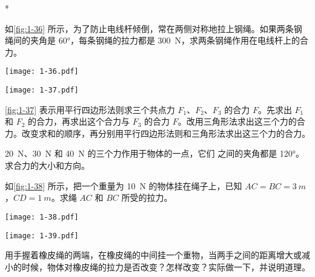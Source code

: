 \begin{Exercise}*
\begin{question}
\item 如\cref{fig:1-36} 所示，为了防止电线杆倾倒，常在两侧对称地拉上钢绳。如果两条钢绳间的夹角是 \ang{60}，每条钢绳的拉力都是 \qty{300}{N}，求两条钢绳作用在电线杆上的合力。
\begin{center}
\begin{minipage}[b]{0.48\linewidth}
  \centering
  \texttt{[image: 1-36.pdf]}
  \label{fig:1-36}
\end{minipage}
\begin{minipage}[b]{0.48\linewidth}
  \centering
  \texttt{[image: 1-37.pdf]}
  \label{fig:1-37}
\end{minipage}
\end{center}
\item  \cref{fig:1-37} 表示用平行四边形法则求三个共点力 $F_1$、$F_2$、$F_3$ 的合力 $F$。先求出 $F_1$ 和 $F_2$ 的合力，再求出这个合力与 $F_3$ 的合力 $F$。改用三角形法求出这三个力的合力。改变求和的顺序，再分别用平行四边形法则和三角形法求出这三个力的合力。
\item   \qty{20}{N}、\qty{30}{N} 和 \qty{40}{N} 的三个力作用于物体的一点，它们
之间的夹角都是 \ang{120}。求合力的大小和方向。
\item 如\cref{fig:1-38} 所示，把一个重量为 \qty{10}{N} 的物体挂在绳子上，已知 $AC=BC=\qty{3}{m}$，$CD=\qty{1}{m}$。求绳 $AC$ 和 $BC$ 所受的拉力。
\begin{figurehere}
  \begin{minipage}[b]{0.5\linewidth}\centering
    \texttt{[image: 1-38.pdf]}
    \caption{}\label{fig:1-38} 
  \end{minipage}
  \begin{minipage}[b]{0.48\linewidth}
    \centering
    \texttt{[image: 1-39.pdf]}
    \caption{}\label{fig:1-39}
  \end{minipage}
\end{figurehere}
\item   用手握着橡皮绳的两端，在橡皮绳的中间挂一个重物，当两手之间的距离增大或减小的时候，物体对橡皮绳的拉力是否改变？怎样改变？实际做一下，并说明道理。


\end{question}
\end{Exercise}

